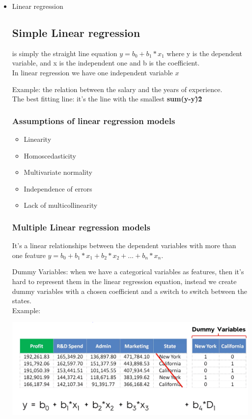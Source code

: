 \documentclass{article}
\begin{document}
\begin{itemize}
  \item Linear regression\\
    
  \subsection{Simple Linear regression} is simply the straight line equation \(y=b_0+b_1*x_1\) where y is the dependent variable, and x is the independent one and b is the coefficient.\\
    In linear regression we have one independent variable \(x\)
  
    Example: the relation between the salary and the years of experience.\\

    The best fitting line: it's the line with the smallest \textbf{sum(y-y\^)\^2} %

    

\subsubsection{Assumptions of linear regression models}
\begin{itemize}
  \item Linearity
  \item Homoscedasticity
  \item Multivariate normality
  \item Independence of errors
  \item Lack of multicollinearity
\end{itemize}

  \subsubsection{Multiple Linear regression models}
  It's a linear relationships between the dependent variables with more than one feature \(y=b_0+b_1*x_1+b_2*x_2 + ... + b_n*x_n\).

  Dummy Variables: 
  when we have a categorical variables as features, then it's hard to represent them in the linear regression equation, instead we create dummy variables with a chosen coefficient and a switch to switch between the states.\\
  
  Example:
  \begin{center}
    \includegraphics[scale=0.50]{./resources/img/02-regression/02-dummy-varaibles.PNG}
  \end{center}
  

\end{itemize}
\end{document}
